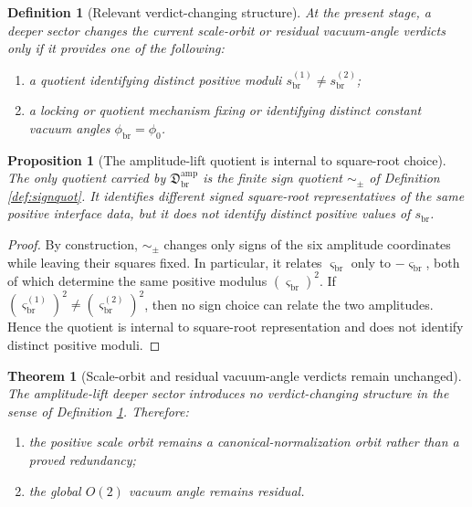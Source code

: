 \documentclass[11pt]{article}
\newcommand{\RespVacPhase}{\phi_{\mathrm{br}}}
\newcommand{\ScaleMod}{s_{\mathrm{br}}}
\newcommand{\DeepSector}{\mathfrak D_{\mathrm{br}}^{\mathrm{amp}}}
\newcommand{\DeepScaleAmp}{\varsigma_{\mathrm{br}}}
\newcommand{\SignQuot}{\sim_{\pm}}
\newtheorem{definition}{Definition}
\newtheorem{proposition}{Proposition}
\newtheorem{theorem}{Theorem}
\begin{document}
\begin{definition}[Relevant verdict-changing structure]
\label{def:relevant}
At the present stage, a deeper sector changes the current scale-orbit or residual vacuum-angle verdicts only if it provides one of the following:
\begin{enumerate}
    \item a quotient identifying distinct positive moduli \(\ScaleMod^{(1)}\neq \ScaleMod^{(2)}\);
    \item a locking or quotient mechanism fixing or identifying distinct constant vacuum angles \(\RespVacPhase=\phi_{0}\).
\end{enumerate}
\end{definition}

\begin{proposition}[The amplitude-lift quotient is internal to square-root choice]
\label{prop:internal}
The only quotient carried by \(\DeepSector\) is the finite sign quotient \(\SignQuot\) of Definition \ref{def:signquot}. It identifies different signed square-root representatives of the same positive interface data, but it does not identify distinct positive values of \(\ScaleMod\).
\end{proposition}

\begin{proof}
By construction, \(\SignQuot\) changes only signs of the six amplitude coordinates while leaving their squares fixed. In particular, it relates \(\DeepScaleAmp\) only to \(-\DeepScaleAmp\), both of which determine the same positive modulus \((\DeepScaleAmp)^{2}\). If \((\DeepScaleAmp^{(1)})^{2}\neq(\DeepScaleAmp^{(2)})^{2}\), then no sign choice can relate the two amplitudes. Hence the quotient is internal to square-root representation and does not identify distinct positive moduli.
\end{proof}

\begin{theorem}[Scale-orbit and residual vacuum-angle verdicts remain unchanged]
\label{thm:verdict}
The amplitude-lift deeper sector introduces no verdict-changing structure in the sense of Definition \ref{def:relevant}. Therefore:
\begin{enumerate}
    \item the positive scale orbit remains a canonical-normalization orbit rather than a proved redundancy;
    \item the global \(O(2)\) vacuum angle remains residual.
\end{enumerate}
\end{theorem}
\end{document}
